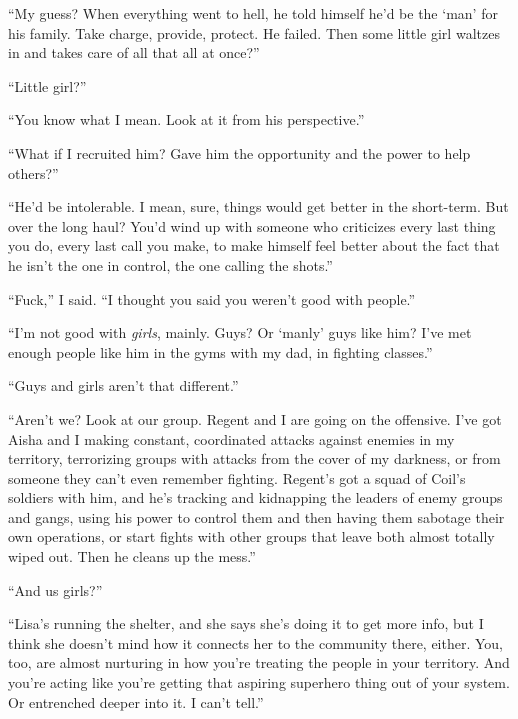 ``My guess?  When everything went to hell, he told himself he'd be the `man' for his family.  Take charge, provide, protect.  He failed.  Then some little girl waltzes in and takes care of all that all at once?''



``Little girl?''



``You know what I mean.  Look at it from his perspective.''



``What if I recruited him?  Gave him the opportunity and the power to help others?''



``He'd be intolerable.  I mean, sure, things would get better in the short-term.  But over the long haul? You'd wind up with someone who criticizes every last thing you do, every last call you make, to make himself feel better about the fact that he isn't the one in control, the one calling the shots.''



``Fuck,'' I said.  ``I thought you said you weren't good with people.''



``I'm not good with \emph{girls}, mainly.  Guys?  Or `manly' guys like him?  I've met enough people like him in the gyms with my dad, in fighting classes.''



``Guys and girls aren't that different.''



``Aren't we?  Look at our group.  Regent and I are going on the offensive.  I've got Aisha and I making constant, coordinated attacks against enemies in my territory, terrorizing groups with attacks from the cover of my darkness, or from someone they can't even remember fighting.  Regent's got a squad of Coil's soldiers with him, and he's tracking and kidnapping the leaders of enemy groups and gangs, using his power to control them and then having them sabotage their own operations, or start fights with other groups that leave both almost totally wiped out.  Then he cleans up the mess.''



``And us girls?''



``Lisa's running the shelter, and she says she's doing it to get more info, but I think she doesn't mind how it connects her to the community there, either.  You, too, are almost nurturing in how you're treating the people in your territory.  And you're acting like you're getting that aspiring superhero thing out of your system.  Or entrenched deeper into it.  I can't tell.''



